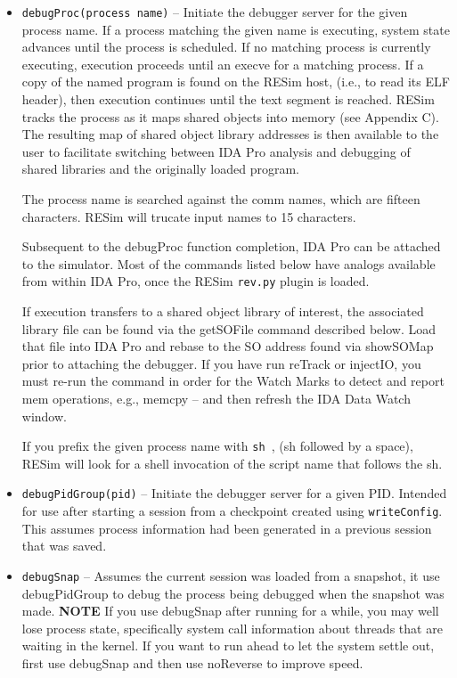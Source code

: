 \documentclass[titlepage]{article}
\begin{document}
\begin{itemize}

\item {\tt debugProc(process name)} – Initiate the debugger server for the given process name.  If a process matching the given name is executing, system state advances until the process is scheduled.  If no matching process is currently executing, execution proceeds until an execve for a matching process.   If a copy of the named program is found on the RESim host, (i.e., to read its ELF header), then execution continues until the text segment is reached.  RESim tracks the process as it maps shared objects into memory (see Appendix C).  The resulting map of shared object library addresses is then available to the user to facilitate switching between IDA Pro analysis and debugging of shared libraries and the originally loaded program.

The process name is searched against the comm names, which are fifteen characters.  RESim will trucate input names to 15 characters.
                                                               

Subsequent to the debugProc  function completion, IDA Pro can be attached to the simulator.  Most of the commands listed below have analogs available from within IDA Pro, once the RESim {\tt rev.py} plugin is loaded.

If execution transfers to a shared object library of interest, the associated library file can be found via the getSOFile command described below.  Load that file into IDA Pro and rebase to the SO address
found via showSOMap prior to attaching the debugger.  If you have run reTrack or injectIO, you must re-run the command in order for the Watch Marks to 
detect and report mem operations, e.g., memcpy -- and then refresh the IDA Data Watch window. 

If you prefix the given process name with {\tt sh }, (sh followed by a space), RESim will look for a shell invocation of the script name that follows the sh.

\item {\tt debugPidGroup(pid)} -- Initiate the debugger server for a given PID.  Intended for use after starting a session from a checkpoint created using
{\tt writeConfig}.  This assumes process information had been generated in a previous session that was saved.  

\item {\tt debugSnap} -- Assumes the current session was loaded from a snapshot, it use debugPidGroup to debug the process being debugged when the snapshot was made.
\textbf{NOTE} If you use debugSnap after running for a while, you may well lose process state, specifically system call information about 
threads that are waiting in the kernel.  If you want to run ahead to let the system settle out, first use debugSnap and then use noReverse to improve speed.


\end{itemize}
\end{document}
